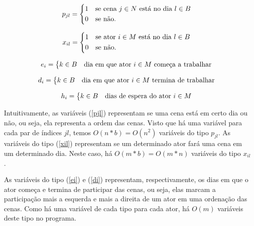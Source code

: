 \documentclass[a4paper,11pt]{article}
\begin{document}
\begin{equation}
  p_{jl} = \begin{dcases*}
              1 & se cena $j \in N$ está no dia $l \in B$ \\
              0 & se não.
           \end{dcases*}
  \label{pjl}
\end{equation}

\begin{equation}
  x_{il} = \begin{dcases*}
              1 & se ator $i \in M$ está no dia $l \in B$ \\
              0 & se não.
           \end{dcases*}
  \label{xil}
\end{equation}

\begin{equation}
  e_{i} = \begin{dcases*} k \in B & dia em que ator $i \in M$ começa a trabalhar \end{dcases*}
  \label{ei}
\end{equation}

\begin{equation}
  d_{i} = \begin{dcases*} k \in B & dia em que ator $i \in M$ termina de trabalhar \end{dcases*}
  \label{di}
\end{equation}

\begin{equation}
  h_{i} = \begin{dcases*} k \in B & dias de espera do ator $i \in M$ \end{dcases*}
  \label{hi}
\end{equation}

Intuitivamente, as variáveis (\ref{pjl}) representam se uma cena está em certo dia
ou não, ou seja, ela representa a ordem das cenas. Visto que há uma variável para
cada par de índices $jl$, temos $O(n*b) = O(n^2)$ variáveis do tipo $p_{jl}$. As
variáveis do tipo (\ref{xil}) representam se um determinado ator fará uma cena
em um determinado dia. Neste caso, há $O(m*b) = O(m*n)$ variáveis do tipo $x_{il}$.

As variáveis do tipo (\ref{ei}) e (\ref{di}) representam, respectivamente, os dias em que o ator
começa e termina de participar das cenas, ou seja, elas marcam a participação
mais a esquerda e mais a direita de um ator em uma ordenação das cenas. Como há
uma variável de cada tipo para cada ator, há $O(m)$ variáveis deste tipo no programa.
\end{document}
